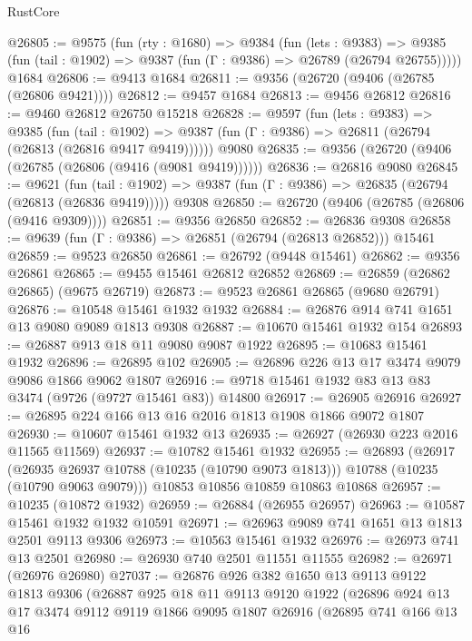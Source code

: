 \begin{lexlean}{RustCore}
\begin{coremodule}
@26805 := @9575
    (fun (rty : @1680) =>
    @9384
      (fun (lets : @9383) =>
      @9385 (fun (tail : @1902) => @9387 (fun (Γ : @9386) => @26789 (@26794 @26755)))))
    @1684
@26806 := @9413 @1684
@26811 := @9356 (@26720 (@9406 (@26785 (@26806 @9421))))
@26812 := @9457 @1684
@26813 := @9456 @26812
@26816 := @9460 @26812 @26750 @15218
@26828 := @9597
    (fun (lets : @9383) =>
    @9385
      (fun (tail : @1902) =>
      @9387 (fun (Γ : @9386) => @26811 (@26794 (@26813 (@26816 @9417 @9419))))))
    @9080
@26835 := @9356 (@26720 (@9406 (@26785 (@26806 (@9416 (@9081 @9419))))))
@26836 := @26816 @9080
@26845 := @9621
    (fun (tail : @1902) => @9387 (fun (Γ : @9386) => @26835 (@26794 (@26813 (@26836 @9419)))))
    @9308
@26850 := @26720 (@9406 (@26785 (@26806 (@9416 @9309))))
@26851 := @9356 @26850
@26852 := @26836 @9308
@26858 := @9639 (fun (Γ : @9386) => @26851 (@26794 (@26813 @26852))) @15461
@26859 := @9523 @26850
@26861 := @26792 (@9448 @15461)
@26862 := @9356 @26861
@26865 := @9455 @15461 @26812 @26852
@26869 := @26859 (@26862 @26865) (@9675 @26719)
@26873 := @9523 @26861 @26865 (@9680 @26791)
@26876 := @10548 @15461 @1932 @1932
@26884 := @26876 @914 @741 @1651 @13 @9080 @9089 @1813 @9308
@26887 := @10670 @15461 @1932 @154
@26893 := @26887 @913 @18 @11 @9080 @9087 @1922
@26895 := @10683 @15461 @1932
@26896 := @26895 @102
@26905 := @26896 @226 @13 @17 @3474 @9079 @9086 @1866 @9062 @1807
@26916 := @9718 @15461 @1932 @83 @13 @83 @3474 (@9726 (@9727 @15461 @83)) @14800
@26917 := @26905 @26916
@26927 := @26895 @224 @166 @13 @16 @2016 @1813 @1908 @1866 @9072 @1807
@26930 := @10607 @15461 @1932 @13
@26935 := @26927 (@26930 @223 @2016 @11565 @11569)
@26937 := @10782 @15461 @1932
@26955 := @26893
    (@26917
      (@26935 @26937 @10788 (@10235 (@10790 @9073 @1813)))
      @10788
      (@10235 (@10790 @9063 @9079)))
    @10853
    @10856
    @10859
    @10863
    @10868
@26957 := @10235 (@10872 @1932)
@26959 := @26884 (@26955 @26957)
@26963 := @10587 @15461 @1932 @1932 @10591
@26971 := @26963 @9089 @741 @1651 @13 @1813 @2501 @9113 @9306
@26973 := @10563 @15461 @1932
@26976 := @26973 @741 @13 @2501
@26980 := @26930 @740 @2501 @11551 @11555
@26982 := @26971 (@26976 @26980)
@27037 := @26876
    @926
    @382
    @1650
    @13
    @9113
    @9122
    @1813
    @9306
    (@26887
      @925
      @18
      @11
      @9113
      @9120
      @1922
      (@26896
        @924
        @13
        @17
        @3474
        @9112
        @9119
        @1866
        @9095
        @1807
        @26916
        (@26895
          @741
          @166
          @13
          @16

\end{coremodule}
\end{lexlean}
